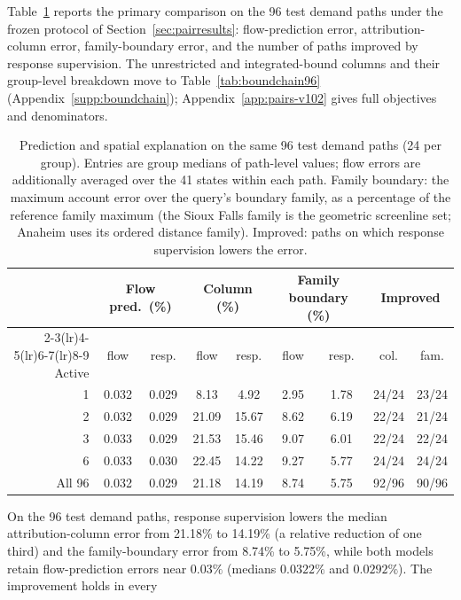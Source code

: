 Table~\ref{tab:pathtable} reports the primary comparison on the 96
test demand paths under the frozen protocol of
Section~\ref{sec:pairresults}: flow-prediction error, attribution-column
error, family-boundary error, and the number of paths improved by
response supervision. The unrestricted and integrated-bound columns
and their group-level breakdown move to
Table~\ref{tab:boundchain96} (Appendix~\ref{supp:boundchain});
Appendix~\ref{app:pairs-v102} gives full objectives and denominators.
\begin{table}[t]\centering\footnotesize
\caption{Prediction and spatial explanation on the same 96 test demand
paths (24 per group). Entries are group medians of path-level values;
flow errors are additionally averaged over the 41 states within each
path. Family boundary: the maximum account error over the query's
boundary family, as a percentage of the reference family maximum (the
Sioux Falls family is the geometric screenline set; Anaheim uses its
ordered distance family). Improved: paths on which response supervision
lowers the error.}\label{tab:pathtable}
\setlength{\tabcolsep}{4.5pt}
\begin{tabular*}{\tblwidth}{@{\extracolsep{\fill}}rcc cc cc cc}
\toprule
& \multicolumn{2}{c}{Flow pred.\ (\%)} & \multicolumn{2}{c}{Column (\%)} & \multicolumn{2}{c}{Family boundary (\%)} & \multicolumn{2}{c}{Improved}\\
\cmidrule(lr){2-3}\cmidrule(lr){4-5}\cmidrule(lr){6-7}\cmidrule(lr){8-9}
Active & flow & resp. & flow & resp. & flow & resp. & col. & fam.\\
\midrule
1 & 0.032 & 0.029 & 8.13 & 4.92 & 2.95 & 1.78 & 24/24 & 23/24\\
2 & 0.032 & 0.029 & 21.09 & 15.67 & 8.62 & 6.19 & 22/24 & 21/24\\
3 & 0.033 & 0.029 & 21.53 & 15.46 & 9.07 & 6.01 & 22/24 & 22/24\\
6 & 0.033 & 0.030 & 22.45 & 14.22 & 9.27 & 5.77 & 24/24 & 24/24\\
\midrule
All 96 & 0.032 & 0.029 & 21.18 & 14.19 & 8.74 & 5.75 & 92/96 & 90/96\\
\bottomrule\end{tabular*}\end{table}
On the 96 test demand paths, response supervision lowers the median
attribution-column error from 21.18\% to 14.19\% (a relative reduction
of one third) and the family-boundary error from 8.74\% to 5.75\%,
while both models retain flow-prediction errors near $0.03\%$ (medians
$0.0322\%$ and $0.0292\%$). The improvement holds in every
